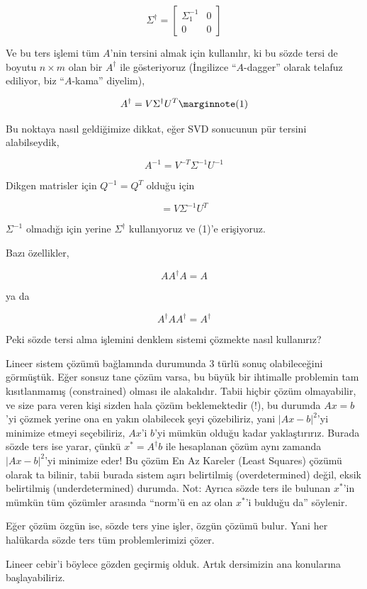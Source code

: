 \documentclass[12pt,fleqn]{article}\usepackage{../../common}
\begin{document}
$$ \Sigma^{\dagger} = \left[\begin{array}{cc}
\Sigma_1^{-1} & 0 \\ 0 & 0 
\end{array}\right]$$

Ve bu ters işlemi tüm $A$'nin tersini almak için kullanılır, ki bu sözde
tersi de boyutu $n \times m$ olan bir $A^{\dagger}$ ile gösteriyoruz
(İngilizce ``$A$-dagger'' olarak telafuz ediliyor, biz ``$A$-kama''
diyelim), 

$$ 
A^{\dagger} = V \Sigma^{\dagger} U^T  
\mlabel{1}
$$

Bu noktaya nasıl geldiğimize dikkat, eğer SVD sonucunun pür tersini
alabilseydik, 

$$ A^{-1} = V^{-T}\Sigma^{-1}U^{-1} $$

Dikgen matrisler için $Q^{-1}=Q^T$ olduğu için 

$$ = V\Sigma^{-1}U^{T} $$

$\Sigma^{-1}$ olmadığı için yerine $\Sigma^{\dagger}$ kullanıyoruz ve (1)'e erişiyoruz.  

Bazı özellikler,

$$ A A^{\dagger} A = A $$

ya da

$$ A^{\dagger} A  A^{\dagger} =  A^{\dagger} $$

Peki sözde tersi alma işlemini denklem sistemi çözmekte nasıl kullanırız? 

Lineer sistem çözümü bağlamında durumunda 3 türlü sonuç olabileceğini
görmüştük. Eğer sonsuz tane çözüm varsa, bu büyük bir ihtimalle problemin
tam kısıtlanmamış (constrained) olması ile alakalıdır. Tabii hiçbir çözüm
olmayabilir, ve size para veren kişi sizden hala çözüm beklemektedir (!),
bu durumda $Ax=b$'yi çözmek yerine ona en yakın olabilecek şeyi
çözebiliriz, yani $|Ax - b|^2$'yi minimize etmeyi seçebiliriz, $Ax$'i
$b$'yi mümkün olduğu kadar yaklaştırırız. Burada sözde ters ise yarar,
çünkü $x^* = A^{\dagger}b$ ile hesaplanan çözüm aynı zamanda $|Ax - b|^2$'yi
minimize eder! Bu çözüm En Az Kareler (Least Squares) çözümü olarak ta
bilinir, tabii burada sistem aşırı belirtilmiş (overdetermined) değil,
eksik belirtilmiş (underdetermined) durumda. Not: Ayrıca sözde ters ile
bulunan $x^*$'in mümkün tüm çözümler arasında ``norm'ü en az olan $x^*$'i
bulduğu da'' söylenir.

Eğer çözüm özgün ise, sözde ters yine işler, özgün çözümü bulur. Yani her
halükarda sözde ters tüm problemlerimizi çözer.

Lineer cebir'i böylece gözden geçirmiş olduk. Artık dersimizin ana
konularına başlayabiliriz. 
\end{document}
